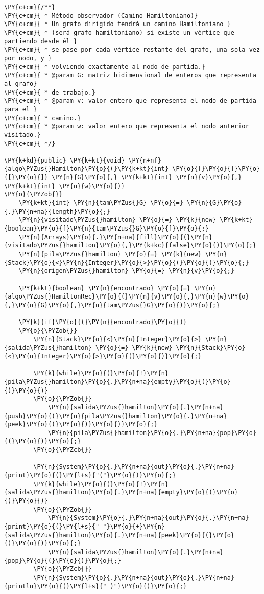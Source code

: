 \begin{Verbatim}[commandchars=\\\{\}]
\PY{c+cm}{/**}
\PY{c+cm}{ * Método observador (Camino Hamiltoniano)}
\PY{c+cm}{ * Un grafo dirigido tendrá un camino Hamiltoniano }
\PY{c+cm}{ * (será grafo hamiltoniano) si existe un vértice que partiendo desde él }
\PY{c+cm}{ * se pase por cada vértice restante del grafo, una sola vez por nodo, y }
\PY{c+cm}{ * volviendo exactamente al nodo de partida.}
\PY{c+cm}{ * @param G: matriz bidimensional de enteros que representa al grafo}
\PY{c+cm}{ * de trabajo.}
\PY{c+cm}{ * @param v: valor entero que representa el nodo de partida para el }
\PY{c+cm}{ * camino.}
\PY{c+cm}{ * @param w: valor entero que representa el nodo anterior visitado.}
\PY{c+cm}{ */}

\PY{k+kd}{public} \PY{k+kt}{void} \PY{n+nf}{algo\PYZus{}Hamilton}\PY{o}{(}\PY{k+kt}{int} \PY{o}{[}\PY{o}{]}\PY{o}{[}\PY{o}{]} \PY{n}{G}\PY{o}{,} \PY{k+kt}{int} \PY{n}{v}\PY{o}{,} \PY{k+kt}{int} \PY{n}{w}\PY{o}{)}
\PY{o}{\PYZob{}}
    \PY{k+kt}{int} \PY{n}{tam\PYZus{}G} \PY{o}{=} \PY{n}{G}\PY{o}{.}\PY{n+na}{length}\PY{o}{;}
    \PY{n}{visitado\PYZus{}hamilton} \PY{o}{=} \PY{k}{new} \PY{k+kt}{boolean}\PY{o}{[}\PY{n}{tam\PYZus{}G}\PY{o}{]}\PY{o}{;}
    \PY{n}{Arrays}\PY{o}{.}\PY{n+na}{fill}\PY{o}{(}\PY{n}{visitado\PYZus{}hamilton}\PY{o}{,}\PY{k+kc}{false}\PY{o}{)}\PY{o}{;}
    \PY{n}{pila\PYZus{}hamilton} \PY{o}{=} \PY{k}{new} \PY{n}{Stack}\PY{o}{<}\PY{n}{Integer}\PY{o}{>}\PY{o}{(}\PY{o}{)}\PY{o}{;}
    \PY{n}{origen\PYZus{}hamilton} \PY{o}{=} \PY{n}{v}\PY{o}{;}

    \PY{k+kt}{boolean} \PY{n}{encontrado} \PY{o}{=} \PY{n}{algo\PYZus{}HamiltonRec}\PY{o}{(}\PY{n}{v}\PY{o}{,}\PY{n}{w}\PY{o}{,}\PY{n}{G}\PY{o}{,}\PY{n}{tam\PYZus{}G}\PY{o}{)}\PY{o}{;}

    \PY{k}{if}\PY{o}{(}\PY{n}{encontrado}\PY{o}{)}
	\PY{o}{\PYZob{}}
	    \PY{n}{Stack}\PY{o}{<}\PY{n}{Integer}\PY{o}{>} \PY{n}{salida\PYZus{}hamilton} \PY{o}{=} \PY{k}{new} \PY{n}{Stack}\PY{o}{<}\PY{n}{Integer}\PY{o}{>}\PY{o}{(}\PY{o}{)}\PY{o}{;}
		
	    \PY{k}{while}\PY{o}{(}\PY{o}{!}\PY{n}{pila\PYZus{}hamilton}\PY{o}{.}\PY{n+na}{empty}\PY{o}{(}\PY{o}{)}\PY{o}{)}
		\PY{o}{\PYZob{}}
		    \PY{n}{salida\PYZus{}hamilton}\PY{o}{.}\PY{n+na}{push}\PY{o}{(}\PY{n}{pila\PYZus{}hamilton}\PY{o}{.}\PY{n+na}{peek}\PY{o}{(}\PY{o}{)}\PY{o}{)}\PY{o}{;}
		    \PY{n}{pila\PYZus{}hamilton}\PY{o}{.}\PY{n+na}{pop}\PY{o}{(}\PY{o}{)}\PY{o}{;}
		\PY{o}{\PYZcb{}}

	    \PY{n}{System}\PY{o}{.}\PY{n+na}{out}\PY{o}{.}\PY{n+na}{print}\PY{o}{(}\PY{l+s}{"("}\PY{o}{)}\PY{o}{;}
	    \PY{k}{while}\PY{o}{(}\PY{o}{!}\PY{n}{salida\PYZus{}hamilton}\PY{o}{.}\PY{n+na}{empty}\PY{o}{(}\PY{o}{)}\PY{o}{)}
		\PY{o}{\PYZob{}}
		    \PY{n}{System}\PY{o}{.}\PY{n+na}{out}\PY{o}{.}\PY{n+na}{print}\PY{o}{(}\PY{l+s}{" "}\PY{o}{+}\PY{n}{salida\PYZus{}hamilton}\PY{o}{.}\PY{n+na}{peek}\PY{o}{(}\PY{o}{)}\PY{o}{)}\PY{o}{;}
		    \PY{n}{salida\PYZus{}hamilton}\PY{o}{.}\PY{n+na}{pop}\PY{o}{(}\PY{o}{)}\PY{o}{;}
		\PY{o}{\PYZcb{}}
	    \PY{n}{System}\PY{o}{.}\PY{n+na}{out}\PY{o}{.}\PY{n+na}{println}\PY{o}{(}\PY{l+s}{" )"}\PY{o}{)}\PY{o}{;}
	

\end{Verbatim}
